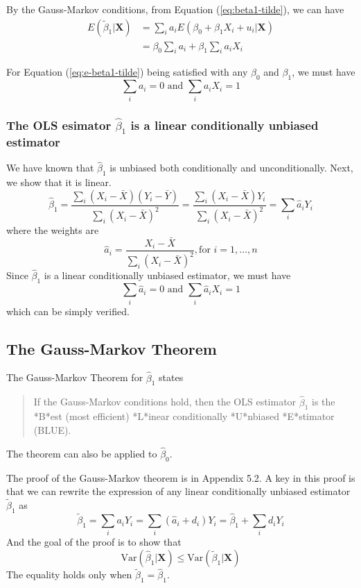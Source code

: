\documentclass[a4paper,11pt]{article}
\newcommand{\var}{\mathrm{Var}}
\begin{document}
By the Gauss-Markov conditions, from Equation (\ref{eq:beta1-tilde}),  we can have
\begin{equation*}
\begin{split}
E(\tilde{\beta}_1 | \mathbf{X}) &= \sum_i a_i E(\beta_0 + \beta_1 X_i + u_i | \mathbf{X}) \\
&= \beta_0 \sum_i a_i + \beta_1 \sum_i a_i X_i
\end{split}
\end{equation*}

For Equation (\ref{eq:e-beta1-tilde}) being satisfied with any
\(\beta_0\) and \(\beta_1\), we must have
\[ \sum_i a_i = 0 \text{ and } \sum_i a_iX_i = 1 \]

\subsubsection*{The OLS esimator \(\hat{\beta}_1\) is a linear conditionally unbiased estimator}
\label{sec:org7311d3e}

We have known that \(\hat{\beta}_1\) is unbiased both conditionally and
unconditionally. Next, we show that it is linear. 
\[ \hat{\beta}_1 = \frac{\sum_i (X_i - \bar{X})(Y_i - \bar{Y})}{\sum_i
(X_i - \bar{X})^2} = \frac{\sum_i (X_i - \bar{X})Y_i}{\sum_i
(X_i - \bar{X})^2} = \sum_i \hat{a}_i Y_i \]
where the weights are
\[ \hat{a}_i = \frac{X_i - \bar{X}}{\sum_i (X_i - \bar{X})^2}, \text{
for } i = 1, \ldots, n \] 
Since \(\hat{\beta}_1\) is a linear conditionally unbiased estimator, we
must have
\[ \sum_i \hat{a}_i = 0 \text{ and } \sum_i \hat{a}_i X_i = 1  \]
which can be simply verified.

\subsection{The Gauss-Markov Theorem}
\label{sec:org430ff29}
The Gauss-Markov Theorem for \(\hat{\beta}_1\) states
\label{org2c15ec0}
\begin{quote}
If the Gauss-Markov conditions hold, then the OLS estimator
\(\hat{\beta}_1\) is the *B*est (most efficient) *L*inear conditionally
*U*nbiased *E*stimator (BLUE).
\end{quote}

The theorem can also be applied to \(\hat{\beta}_0\).

The proof of the Gauss-Markov theorem is in Appendix 5.2. A key in
this proof is that we can rewrite the expression of any linear
conditionally unbiased estimator \(\tilde{\beta}_1\) as
\[ \tilde{\beta}_1 = \sum_i a_i Y_i = \sum_i (\hat{a}_i + d_i)Y_i =
\hat{\beta}_1 + \sum_i d_i Y_i \]
And the goal of
the proof is to show that
\[ \var(\hat{\beta}_1 | \mathbf{X}) \leq \var(\tilde{\beta}_1 |
\mathbf{X}) \]
The equality holds only when \(\tilde{\beta}_1 = \hat{\beta}_1\). 
\end{document}
